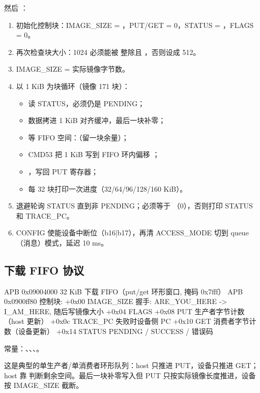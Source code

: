 然后 ：

\begin{enumerate}
  \item 初始化控制块：IMAGE\_SIZE = ，PUT/GET = 0，STATUS = ，FLAGS = 0。
  \item 再次检查块大小：1024 必须能被  整除且 ，否则设成 512。
  \item IMAGE\_SIZE = 实际镜像字节数。
  \item 以 1 KiB 为块循环（镜像 171 块）：
    \begin{itemize}
      \item 读 STATUS，必须仍是 PENDING；
      \item 数据拷进 1 KiB 对齐缓冲，最后一块补零；
      \item 等 FIFO 空间：（留一块余量）；
      \item CMD53 把 1 KiB 写到 FIFO 环内偏移 ；
      \item {}，写回 PUT 寄存器；
      \item 每 32 块打印一次进度（32/64/96/128/160 KiB）。
    \end{itemize}
  \item 退避轮询 STATUS 直到非 PENDING；必须等于 （0），否则打印 STATUS 和 TRACE\_PC。
  \item CONFIG 使能设备中断位（b16|b17），再清 ACCESS\_MODE 切到 queue（消息）模式，延迟 10 ms。
\end{enumerate}

\subsection{下载 FIFO 协议}

\begin{txtcode}
APB 0x09004000  32 KiB 下载 FIFO（put/get 环形窗口, 掩码 0x7fff）
APB 0x0900ff80  控制块:
  +0x00 IMAGE_SIZE    握手: ARE_YOU_HERE -> I_AM_HERE, 随后写镜像大小
  +0x04 FLAGS
  +0x08 PUT           生产者字节计数（host 更新）
  +0x0c TRACE_PC      失败时设备侧 PC
  +0x10 GET           消费者字节计数（设备更新）
  +0x14 STATUS        PENDING / SUCCESS / 错误码
\end{txtcode}

常量：、、、。

这是典型的单生产者/单消费者环形队列：host 只推进 PUT，设备只推进 GET；host 靠  判断剩余空间。最后一块补零写入但 PUT 只按实际镜像长度推进，设备按 IMAGE\_SIZE 截断。

